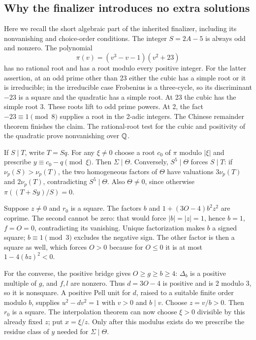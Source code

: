 \subsection{Why the finalizer introduces no extra solutions}

Here we recall the short algebraic part of the inherited finalizer,
including its nonvanishing and choice-order conditions. The integer
$S=2A-5$ is always odd and nonzero. The polynomial
\[
 \pi(v)=(v^3-v-1)(v^2+23)
\]
has no rational root and has a root modulo every positive integer.
For the latter assertion, at an odd prime other than 23 either the
cubic has a simple root or it is irreducible; in the irreducible case
Frobenius is a three-cycle, so its discriminant $-23$ is a square and
the quadratic has a simple root. At 23 the cubic has the simple root
3. These roots lift to odd prime powers. At 2, the fact
$-23\equiv1\pmod8$ supplies a root in the 2-adic integers.
The Chinese remainder theorem finishes the claim. The rational-root
test for the cubic and positivity of the quadratic prove nonvanishing
over $\mathbb Q$.

If $S\mid T$, write $T=Sq$. For any $\xi\ne0$ choose a root
$c_0$ of $\pi$ modulo $|\xi|$ and prescribe
$y\equiv c_0-q\pmod\xi$. Then $\Sigma\mid\Theta$.
Conversely, $S^5\mid\Theta$ forces $S\mid T$: if
$\nu_p(S)>\nu_p(T)$, the two homogeneous factors of $\Theta$
have valuations $3\nu_p(T)$ and $2\nu_p(T)$, contradicting
$S^5\mid\Theta$. Also $\Theta\ne0$, since otherwise
$\pi((T+Sy)/S)=0$.

Suppose $z\ne0$ and $r_0$ is a square. The factors
$b$ and $1+(3O-4)b^2z^2$ are coprime. The second cannot be zero:
that would force $|b|=|z|=1$, hence $b=1$, $f=O=0$, contradicting
its vanishing. Unique factorization makes $b$ a signed square;
$b\equiv1\pmod3$ excludes the negative sign. The other factor is
then a square as well, which forces $O>0$ because for $O\le0$
it is at most $1-4(bz)^2<0$.

For the converse, the positive bridge gives $O\ge g\ge b\ge4$:
$\Delta_b$ is a positive multiple of $g$, and $f,l$ are nonzero.
Thus $d=3O-4$ is positive and is 2 modulo 3, so it is nonsquare.
A positive Pell unit for $d$, raised to a suitable finite order
modulo $b$, supplies
$u^2-dv^2=1$ with $v>0$ and $b\mid v$.
Choose $z=v/b>0$. Then $r_0$ is a square. The interpolation theorem
can now choose $\xi>0$ divisible by this already fixed $z$; put
$x=\xi/z$. Only after this modulus exists do we prescribe the
residue class of $y$ needed for $\Sigma\mid\Theta$.

